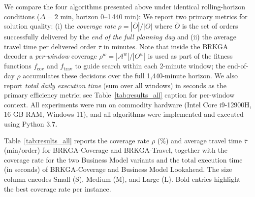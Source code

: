 \documentclass[runningheads]{llncs}
\begin{document}
We compare the four algorithms presented above under identical rolling-horizon conditions ($\Delta = 2$ min, horizon 0--1\,440 min): We report two primary metrics for solution quality: (i) the \emph{coverage rate} $\rho = |\bar{O}|/|O|$ where $\bar{O}$ is the set of orders successfully delivered by the \emph{end of the full planning day} and (ii) the average travel time per delivered order $\bar{\tau}$ in minutes. Note that inside the BRKGA decoder a \emph{per-window} coverage $\rho^w = |\mathcal{A}^w|/|O^w|$ is used as part of the fitness functions $f_{\text{cov}}$ and $f_{\text{trav}}$ to guide search within each 2-minute window; the end-of-day $\rho$ accumulates these decisions over the full 1,440-minute horizon.
We also report \emph{total daily execution time} (sum over all windows) in seconds as the primary efficiency metric; see Table~\ref{tab:results_all} caption for per-window context. All experiments were run on commodity hardware (Intel Core i9-12900H, 16 GB RAM, Windows 11), and all algorithms were implemented and executed using Python 3.7.


Table~\ref{tab:results_all} reports the coverage rate $\rho$ (\%) and average travel time $\bar{\tau}$ (min/order) for BRKGA-Coverage and BRKGA-Travel, together with the coverage rate for the two Business Model variants and the total execution time (in seconds) of BRKGA-Coverage and Business Model Lookahead. The size column encodes Small (S), Medium (M), and Large (L). Bold entries highlight the best coverage rate per instance.
\end{document}
